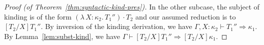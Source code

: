 \documentclass{article}
\newcommand{\abs}[4]{{#1}\, #2\! : \! #3.\, #4}
\newcommand{\tpsynth}[0]{\Rightarrow}
\begin{document}
\begin{proof}[Proof (of Theorem~\ref{thm:syntactic-kind-pres})]
  In the other subcase, the subject of kinding is of the form
  \((\abs{\lambda}{X}{\kappa_2}{T_1''}) \cdot T_2\) and our assumed reduction is
  to \([T_2/X]T_1''\). By inversion of the kinding derivation, we have
  \(\Gamma,X:\kappa_2 \vdash T_1'' \tpsynth \kappa_1\). By
  Lemma~\ref{lem:subst-kind}, we have \(\Gamma \vdash [T_2/X]T_1'' \tpsynth
  [T_2/X]\kappa_1\).

\end{proof}
\end{document}
